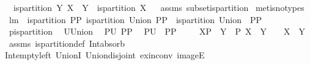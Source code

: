 \begin{isabellebody}
{\isafoldproof}%
%
\isadelimproof
%
\endisadelimproof
\isanewline
\isanewline
{}\isamarkupfalse%
\ \ {\isachardoublequoteopen}is{\isacharunderscore}partition\ Y{\isachardoublequoteclose}\ {\isachardoublequoteopen}X\ {\isasymsubseteq}\ Y{\isachardoublequoteclose}\ \ {\isachardoublequoteopen}is{\isacharunderscore}partition\ X{\isachardoublequoteclose}%
\isadelimproof
\ %
\endisadelimproof
%
\isatagproof
{}\isamarkupfalse%
\ assms\ subset{\isacharunderscore}is{\isacharunderscore}partition\isanewline
{}\isamarkupfalse%
\ {\isacharparenleft}metis{\isacharparenleft}no{\isacharunderscore}types{\isacharparenright}{\isacharparenright}%
\endisatagproof
{\isafoldproof}%
%
\isadelimproof
%
\endisadelimproof
\isanewline
\isanewline
{}\isamarkupfalse%
\ lm{}{}{\isacharcolon}\ \ {\isachardoublequoteopen}is{\isacharunderscore}partition\ PP{\isachardoublequoteclose}\ {\isachardoublequoteopen}is{\isacharunderscore}partition\ {\isacharparenleft}Union\ PP{\isacharparenright}{\isachardoublequoteclose}\ \ {\isachardoublequoteopen}is{\isacharunderscore}partition\ {\isacharparenleft}Union\ {\isacharbackquote}\ PP{\isacharparenright}{\isachardoublequoteclose}\isanewline
%
\isadelimproof
%
\endisadelimproof
%
\isatagproof
{}\isamarkupfalse%
\ {\isacharminus}\isanewline
{}\isamarkupfalse%
\ {\isacharquery}p{\isacharequal}is{\isacharunderscore}partition\ \isamarkupfalse%
\ {\isacharquery}U{\isacharequal}Union\ \isamarkupfalse%
\ {\isacharquery}P{}{\isacharequal}{\isachardoublequoteopen}{\isacharquery}U\ PP{\isachardoublequoteclose}\ \isamarkupfalse%
\ {\isacharquery}P{}{\isacharequal}{\isachardoublequoteopen}{\isacharquery}U\ {\isacharbackquote}\ PP{\isachardoublequoteclose}\ \isamarkupfalse%
\ \isanewline
{}{\isacharcolon}\ {\isachardoublequoteopen}{\isasymforall}\ X{\isasymin}{\isacharquery}P{}{\isachardot}\ {\isasymforall}\ Y\ {\isasymin}\ {\isacharquery}P{}{\isachardot}\ {\isacharparenleft}X\ {\isasyminter}\ Y\ {\isacharequal}\ {\isacharbraceleft}{\isacharbraceright}\ {\isasymlongrightarrow}\ X\ {\isasymnoteq}\ Y{\isacharparenright}{\isachardoublequoteclose}\ \isamarkupfalse%
\ assms\ is{\isacharunderscore}partition{\isacharunderscore}def\ Int{\isacharunderscore}absorb\ \isanewline
Int{\isacharunderscore}empty{\isacharunderscore}left\ UnionI\ Union{\isacharunderscore}disjoint\ ex{\isacharunderscore}in{\isacharunderscore}conv\ imageE\ \isamarkupfalse%

\end{isabellebody}
